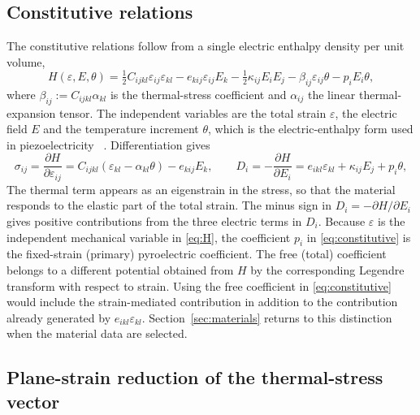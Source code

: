 \documentclass[pdflatex,sn-mathphys-num]{sn-jnl}
\begin{document}
\subsection{Constitutive relations}

The constitutive relations follow from a single electric enthalpy density per unit
volume,
\begin{equation}
H(\varepsilon,E,\theta)=\tfrac12 C_{ijkl}\varepsilon_{ij}\varepsilon_{kl}
-e_{kij}\varepsilon_{ij}E_k-\tfrac12\kappa_{ij}E_iE_j-\beta_{ij}\varepsilon_{ij}\theta
-p_iE_i\theta,
\label{eq:H}
\end{equation}
where $\beta_{ij}:=C_{ijkl}\alpha_{kl}$ is the thermal-stress coefficient and
$\alpha_{ij}$ the linear thermal-expansion tensor. The independent variables are the
total strain $\varepsilon$, the electric field $E$ and the temperature increment
$\theta$, which is the electric-enthalpy form used in piezoelectricity
~\cite{Tiersten1969b,Yang2005b}. Differentiation gives
\begin{equation}
\sigma_{ij}=\frac{\partial H}{\partial\varepsilon_{ij}}
=C_{ijkl}(\varepsilon_{kl}-\alpha_{kl}\theta)-e_{kij}E_k,
\qquad
D_i=-\frac{\partial H}{\partial E_i}
=e_{ikl}\varepsilon_{kl}+\kappa_{ij}E_j+p_i\theta,
\label{eq:constitutive}
\end{equation}
The thermal term appears as an eigenstrain in the stress, so that the material responds
to the elastic part of the total strain. The minus sign in
$D_i=-\partial H/\partial E_i$ gives positive contributions from the three electric
terms in $D_i$. Because $\varepsilon$ is the independent mechanical variable in
\eqref{eq:H}, the coefficient $p_i$ in \eqref{eq:constitutive} is the fixed-strain
(primary) pyroelectric coefficient. The free (total) coefficient belongs to a different
potential obtained from $H$ by the corresponding Legendre transform with respect to
strain. Using the free coefficient in \eqref{eq:constitutive} would include the
strain-mediated contribution in addition to the contribution already generated by
$e_{ikl}\varepsilon_{kl}$. Section~\ref{sec:materials} returns to this distinction when
the material data are selected.

\subsection{Plane-strain reduction of the thermal-stress vector}
\label{sec:planestrain}
\end{document}
